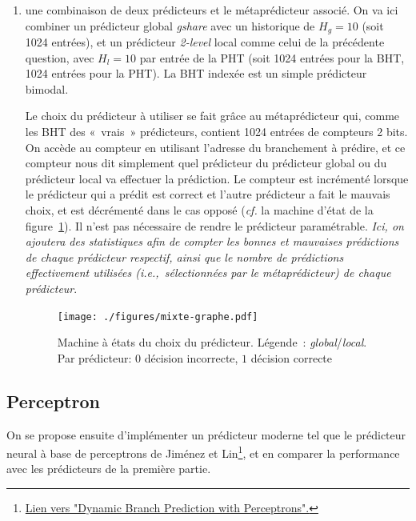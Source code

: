 \documentclass[a4paper]{article}
\begin{document}
\begin{enumerate}
\item une combinaison de deux prédicteurs et le métaprédicteur associé. On va ici combiner un prédicteur global \textit{gshare} avec un historique de $H_g=10$ (soit 1024 entrées), et un prédicteur \textit{2-level} local comme celui de la précédente question, avec $H_l=10$ par entrée de la PHT (soit 1024 entrées pour la BHT, 1024 entrées pour la PHT).
La BHT indexée est un simple prédicteur bimodal.

Le choix du prédicteur à utiliser se fait grâce au métaprédicteur qui, comme les BHT des «~vrais~» prédicteurs, contient 1024 entrées de compteurs 2 bits. On accède au compteur en utilisant l'adresse du branchement à prédire, et ce compteur nous dit simplement quel prédicteur du prédicteur global ou du prédicteur local va effectuer la prédiction. Le compteur est incrémenté lorsque le prédicteur qui a prédit est correct et l'autre prédicteur a fait le mauvais choix, et est décrémenté dans le cas opposé (\emph{cf.} la machine d'état de la figure~\ref{mixte-graphe}). Il n'est pas nécessaire de rendre le prédicteur paramétrable. \textit{Ici, on ajoutera des statistiques afin de compter les bonnes et mauvaises prédictions de chaque prédicteur respectif, ainsi que le nombre de prédictions effectivement utilisées (i.e.,~sélectionnées par le métaprédicteur) de chaque prédicteur}.



\begin{figure}[hbt]\center\leavevmode
      \texttt{[image: ./figures/mixte-graphe.pdf]}
      \caption{Machine à états du choix du prédicteur.
      Légende~: \emph{global}/\emph{local}. Par prédicteur: $0$ décision incorrecte, $1$ décision correcte}
      \label{mixte-graphe}
      \end{figure}
\end{enumerate}


\subsection{Perceptron}

On se propose ensuite d'implémenter un prédicteur moderne tel que le prédicteur neural à base de perceptrons de Jiménez et Lin\footnote{\href{https://www.cs.cmu.edu/afs/cs/academic/class/15740-f18/www/papers/hpca01-jiminez-perceptron.pdf}{Lien vers "Dynamic Branch Prediction with Perceptrons".}}, et en comparer la performance avec les prédicteurs de la première partie. \\
\end{document}
